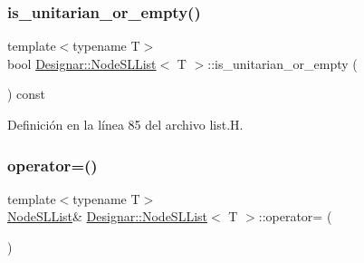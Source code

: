 \subsubsection{\texorpdfstring{is\+\_\+unitarian\+\_\+or\+\_\+empty()}{is\_unitarian\_or\_empty()}}
{\footnotesize\ttfamily template$<$typename T$>$ \\
bool \hyperlink{class_designar_1_1_node_s_l_list}{Designar\+::\+Node\+S\+L\+List}$<$ T $>$\+::is\+\_\+unitarian\+\_\+or\+\_\+empty (\begin{DoxyParamCaption}{ }\end{DoxyParamCaption}) const\hspace{0.3cm}{\ttfamily [inline]}}



Definición en la línea 85 del archivo list.\+H.

\mbox{\label{class_designar_1_1_node_s_l_list_a31a9e8aea9795ba5c2bf4f146f8cfe57}} 
\subsubsection{\texorpdfstring{operator=()}{operator=()}\hspace{0.1cm}{\footnotesize\ttfamily [1/2]}}
{\footnotesize\ttfamily template$<$typename T$>$ \\
\hyperlink{class_designar_1_1_node_s_l_list}{Node\+S\+L\+List}\& \hyperlink{class_designar_1_1_node_s_l_list}{Designar\+::\+Node\+S\+L\+List}$<$ T $>$\+::operator= (\begin{DoxyParamCaption}\item[{const \hyperlink{class_designar_1_1_node_s_l_list}{Node\+S\+L\+List}$<$ T $>$ \&}]{ }\end{DoxyParamCaption})\hspace{0.3cm}{\ttfamily [delete]}}

\mbox{\label{class_designar_1_1_node_s_l_list_a1b35741a071a185842be3604b44fc003}} 
